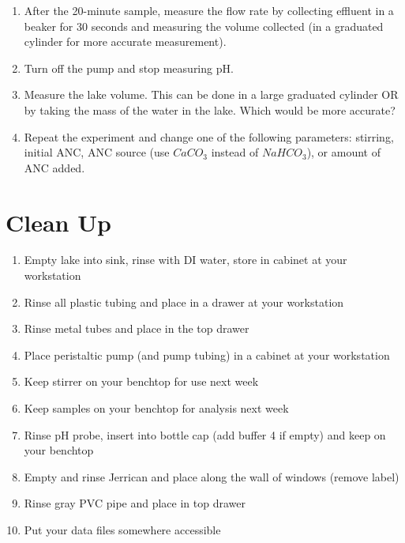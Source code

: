 \documentclass[letterpaper,10pt,english]{sphinxmanual}
\begin{document}
\begin{enumerate}
\item {} 
After the 20-minute sample, measure the flow rate by collecting effluent in a beaker for 30 seconds and measuring the volume collected (in a graduated cylinder for more accurate measurement).

\item {} 
Turn off the pump and stop measuring pH.

\item {} 
Measure the lake volume.  This can be done in a large graduated cylinder OR by taking the mass of the water in the lake.  Which would be more accurate?

\item {} 
Repeat the experiment and change one of the following parameters: stirring, initial ANC, ANC source (use \(CaCO_3\) instead of \(NaHCO_3\)), or amount of ANC added.

\end{enumerate}


\section{Clean Up}
\label{\detokenize{Acid_Rain/Acid_Rain:clean-up}}\label{\detokenize{Acid_Rain/Acid_Rain:heading-acid-rain-clean-up}}\begin{enumerate}
\item {} 
Empty lake into sink, rinse with DI water, store in cabinet at your workstation

\item {} 
Rinse all plastic tubing and place in a drawer at your workstation

\item {} 
Rinse metal tubes and place in the top drawer

\item {} 
Place peristaltic pump (and pump tubing) in a cabinet at your workstation

\item {} 
Keep stirrer on your benchtop for use next week

\item {} 
Keep samples on your benchtop for analysis next week

\item {} 
Rinse pH probe, insert into bottle cap (add buffer 4 if empty) and keep on your benchtop

\item {} 
Empty and rinse Jerrican and place along the wall of windows (remove label)

\item {} 
Rinse gray PVC pipe and place in top drawer

\item {} 
Put your data files somewhere accessible

\end{enumerate}
\end{document}
